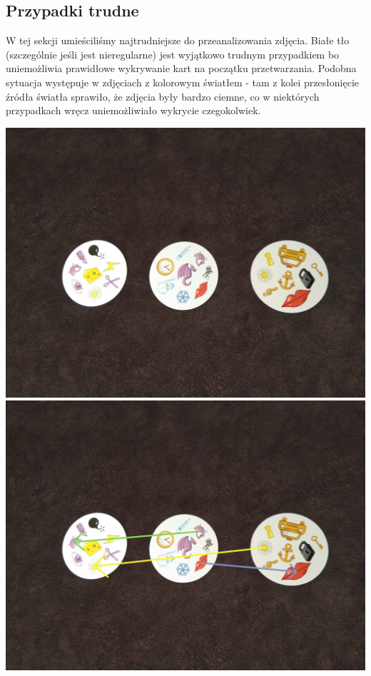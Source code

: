 \documentclass[10pt,a4paper]{article}
\begin{document}
\subsection{Przypadki trudne}
W tej sekcji umieściliśmy najtrudniejsze do przeanalizowania zdjęcia. Białe tło (szczególnie jeśli jest nieregularne) jest wyjątkowo trudnym przypadkiem bo uniemożliwia prawidłowe wykrywanie kart na początku przetwarzania. Podobna sytuacja występuje w zdjęciach z kolorowym światłem - tam z kolei przesłonięcie źródła światła sprawiło, że zdjęcia były bardzo ciemne, co w niektórych przypadkach wręcz uniemożliwiało wykrycie czegokolwiek.
\newpage
\begin{center}
\includegraphics[scale=0.28]{hard/dobble11.jpg}
\includegraphics[scale=0.28]{hard/img_arrows11.jpg}\\

\end{center}
\end{document}
